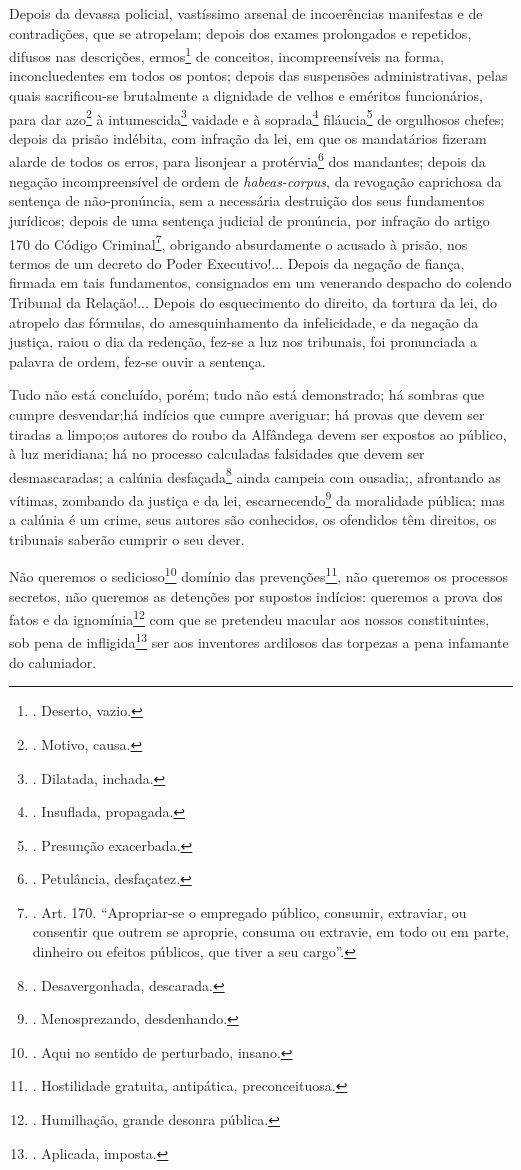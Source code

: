 Depois da devassa policial, vastíssimo arsenal de incoerências
manifestas e de contradições, que se atropelam; depois dos exames
prolongados e repetidos, difusos nas descrições, ermos\footnote{.
  Deserto, vazio.} de conceitos, incompreensíveis na forma,
inconcluedentes em todos os pontos; depois das suspensões
administrativas, pelas quais sacrificou-se brutalmente a dignidade de
velhos e eméritos funcionários, para dar azo\footnote{. Motivo, causa.}
à intumescida\footnote{. Dilatada, inchada.} vaidade e à
soprada\footnote{. Insuflada, propagada.} filáucia\footnote{. Presunção
  exacerbada.} de orgulhosos chefes; depois da prisão indébita, com
infração da lei, em que os mandatários fizeram alarde de todos os erros,
para lisonjear a protérvia\footnote{. Petulância, desfaçatez.} dos
mandantes; depois da negação incompreensível de ordem de
\emph{habeas-corpus}, da revogação caprichosa da sentença de
não-pronúncia, sem a necessária destruição dos seus fundamentos
jurídicos; depois de uma sentença judicial de pronúncia, por infração do
artigo 170 do Código Criminal\footnote{. Art. 170. ``Apropriar-se o
  empregado público, consumir, extraviar, ou consentir que outrem se
  aproprie, consuma ou extravie, em todo ou em parte, dinheiro ou
  efeitos públicos, que tiver a seu cargo''.}, obrigando absurdamente o
acusado à prisão, nos termos de um decreto do Poder Executivo!... Depois
da negação de fiança, firmada em tais fundamentos, consignados em um
venerando despacho do colendo Tribunal da Relação!... Depois do
esquecimento do direito, da tortura da lei, do atropelo das fórmulas, do
amesquinhamento da infelicidade, e da negação da justiça, raiou o dia da
redenção, fez-se a luz nos tribunais, foi pronunciada a palavra de
ordem, fez-se ouvir a sentença.

Tudo não está concluído, porém; tudo não está demonstrado; há sombras
que cumpre desvendar;há indícios que cumpre averiguar; há provas que
devem ser tiradas a limpo;os autores do roubo da Alfândega devem ser
expostos ao público, à luz meridiana; há no processo calculadas
falsidades que devem ser desmascaradas; a calúnia desfaçada\footnote{.
  Desavergonhada, descarada.} ainda campeia com ousadia;, afrontando as
vítimas, zombando da justiça e da lei, escarnecendo\footnote{.
  Menosprezando, desdenhando.} da moralidade pública; mas a calúnia é um
crime, seus autores são conhecidos, os ofendidos têm direitos, os
tribunais saberão cumprir o seu dever.

Não queremos o sedicioso\footnote{. Aqui no sentido de perturbado,
  insano.} domínio das prevenções\footnote{. Hostilidade gratuita,
  antipática, preconceituosa.}, não queremos os processos secretos, não
queremos as detenções por supostos indícios: queremos a prova dos fatos
e da ignomínia\footnote{. Humilhação, grande desonra pública.} com que
se pretendeu macular aos nossos constituintes, sob pena de
infligida\footnote{. Aplicada, imposta.} ser aos inventores ardilosos
das torpezas a pena infamante do caluniador.

